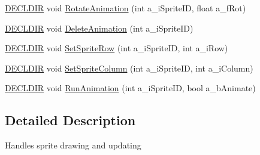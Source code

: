 \begin{DoxyCompactItemize}
\hyperlink{_framework_8h_a6b6635274dbcf57e29a0140cd8cf0305}{D\-E\-C\-L\-D\-I\-R} void \hyperlink{group___sprites_gad13877d8c7bf14c5d2ab13eb1fd088de}{Rotate\-Animation} (int a\-\_\-i\-Sprite\-I\-D, float a\-\_\-f\-Rot)
\item 
\hyperlink{_framework_8h_a6b6635274dbcf57e29a0140cd8cf0305}{D\-E\-C\-L\-D\-I\-R} void \hyperlink{group___sprites_gaaeb24ec2fe65b23055538ab9a109c53c}{Delete\-Animation} (int a\-\_\-i\-Sprite\-I\-D)
\item 
\hyperlink{_framework_8h_a6b6635274dbcf57e29a0140cd8cf0305}{D\-E\-C\-L\-D\-I\-R} void \hyperlink{group___sprites_ga6cb6995dd62e9ea3ffce5f8e5aa66a92}{Set\-Sprite\-Row} (int a\-\_\-i\-Sprite\-I\-D, int a\-\_\-i\-Row)
\item 
\hyperlink{_framework_8h_a6b6635274dbcf57e29a0140cd8cf0305}{D\-E\-C\-L\-D\-I\-R} void \hyperlink{group___sprites_ga5a3758be380f09d1c55b7377d34c994a}{Set\-Sprite\-Column} (int a\-\_\-i\-Sprite\-I\-D, int a\-\_\-i\-Column)
\item 
\hyperlink{_framework_8h_a6b6635274dbcf57e29a0140cd8cf0305}{D\-E\-C\-L\-D\-I\-R} void \hyperlink{group___sprites_gaf49d37ba61564b07c9ee38ea7f4676e5}{Run\-Animation} (int a\-\_\-i\-Sprite\-I\-D, bool a\-\_\-b\-Animate)
\end{DoxyCompactItemize}


\subsection{Detailed Description}
Handles sprite drawing and updating 

